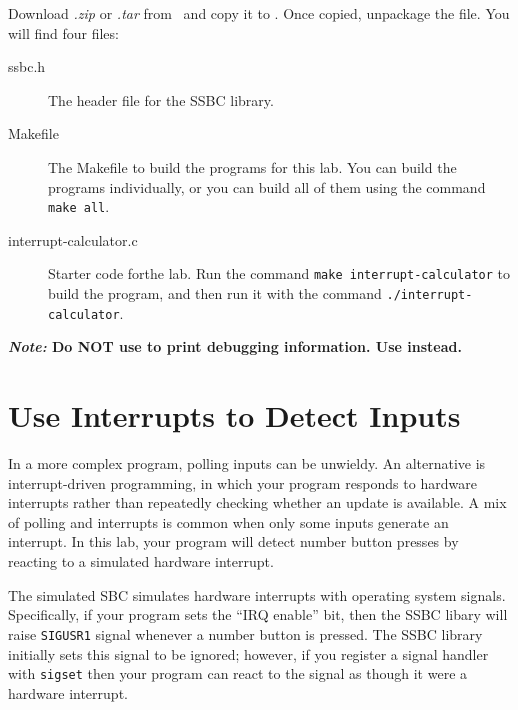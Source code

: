 Download \textit{\shortlabname.zip} or \textit{\shortlabname.tar} from
\filesource\ and copy it to \runtimeenvironment. Once copied, unpackage the
file. You will find four files:
\begin{description}
    \item [ssbc.h] The header file for the SSBC library.
    \item [Makefile] The Makefile to build the programs for this lab. You can build the programs individually, or you can build all of them using the command \texttt{make all}.
    \item [interrupt-calculator.c] Starter code forthe lab. Run the
        command \texttt{make interrupt-calculator} to build the program, and
        then run it with the command \texttt{./interrupt-calculator}.
\end{description}

\textbf{\textit{Note: }Do NOT use  to print debugging
information. Use  instead.}

\section{Use Interrupts to Detect Inputs} \label{interrupts}

In a more complex program, polling inputs can be unwieldy. An alternative is
interrupt-driven programming, in which your program responds to hardware
interrupts rather than repeatedly checking whether an update is available. A
mix of polling and interrupts is common when only some inputs generate an
interrupt. In this lab, your program will detect number button presses by
reacting to a simulated hardware interrupt.

The simulated SBC simulates hardware interrupts with operating system signals.
Specifically, if your program sets the ``IRQ enable'' bit, then the SSBC libary
will raise \texttt{SIGUSR1} signal whenever a number button is pressed. The
SSBC library initially sets this signal to be ignored; however, if you register
a signal handler with \texttt{sigset} then your program can react to the signal
as though it were a hardware interrupt.

